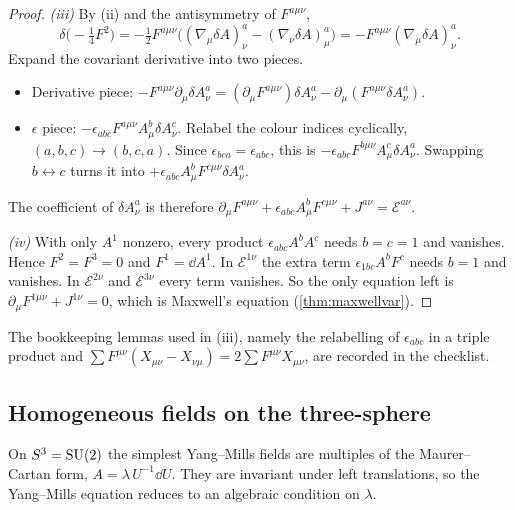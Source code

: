 \begin{proof}
\emph{(iii)} By (ii) and the antisymmetry of $F^{a\mu\nu}$,
\[
\delta\bigl(-\tfrac14F^2\bigr)=-\tfrac12F^{a\mu\nu}\bigl((\nabla_\mu\delta A)^a_\nu-(\nabla_\nu\delta A)^a_\mu\bigr)=-F^{a\mu\nu}(\nabla_\mu\delta A)^a_\nu .
\]
Expand the covariant derivative into two pieces.
\begin{itemize}[nosep]
\item Derivative piece: $-F^{a\mu\nu}\partial_\mu\delta A^a_\nu=(\partial_\mu F^{a\mu\nu})\delta A^a_\nu-\partial_\mu(F^{a\mu\nu}\delta A^a_\nu)$.
\item $\epsilon$ piece: $-\epsilon_{abc}F^{a\mu\nu}A^b_\mu\delta A^c_\nu$. Relabel the colour indices cyclically, $(a,b,c)\to(b,c,a)$. Since $\epsilon_{bca}=\epsilon_{abc}$, this is $-\epsilon_{abc}F^{b\mu\nu}A^c_\mu\delta A^a_\nu$. Swapping $b\leftrightarrow c$ turns it into $+\epsilon_{abc}A^b_\mu F^{c\mu\nu}\delta A^a_\nu$.
\end{itemize}
The coefficient of $\delta A^a_\nu$ is therefore $\partial_\mu F^{a\mu\nu}+\epsilon_{abc}A^b_\mu F^{c\mu\nu}+J^{a\nu}=\mathcal E^{a\nu}$.

\emph{(iv)} With only $A^1$ nonzero, every product $\epsilon_{abc}A^b A^c$ needs $b=c=1$ and vanishes. Hence $F^2=F^3=0$ and $F^1=\dd A^1$. In $\mathcal E^{1\nu}$ the extra term $\epsilon_{1bc}A^bF^c$ needs $b=1$ and vanishes. In $\mathcal E^{2\nu}$ and $\mathcal E^{3\nu}$ every term vanishes. So the only equation left is $\partial_\mu F^{1\mu\nu}+J^{1\nu}=0$, which is Maxwell's equation (\cref{thm:maxwellvar}).
\end{proof}


The bookkeeping lemmas used in (iii), namely the relabelling of $\epsilon_{abc}$ in a triple product and $\sum F^{\mu\nu}(X_{\mu\nu}-X_{\nu\mu})=2\sum F^{\mu\nu}X_{\mu\nu}$, are recorded in the checklist.

\subsection*{Homogeneous fields on the three-sphere}

On $S^3=\mathrm{SU}(2)$ the simplest Yang--Mills fields are multiples of the Maurer--Cartan form, $A=\lambda\,U^{-1}\dd U$. They are invariant under left translations, so the Yang--Mills equation reduces to an algebraic condition on $\lambda$.

